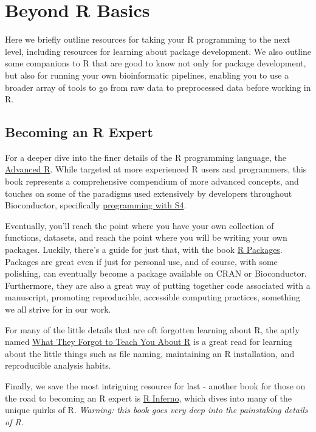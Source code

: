 \documentclass[]{book}
\begin{document}
\hypertarget{beyond-r-basics}{%
\chapter{Beyond R Basics}\label{beyond-r-basics}}

Here we briefly outline resources for taking your R programming to the next level, including resources for learning about package development. We also outline some companions to R that are good to know not only for package development, but also for running your own bioinformatic pipelines, enabling you to use a broader array of tools to go from raw data to preprocessed data before working in R.

\hypertarget{becoming-an-r-expert}{%
\section{Becoming an R Expert}\label{becoming-an-r-expert}}

For a deeper dive into the finer details of the R programming language, the \href{https://adv-r.hadley.nz/}{Advanced R}. While targeted at more experienced R users and programmers, this book represents a comprehensive compendium of more advanced concepts, and touches on some of the paradigms used extensively by developers throughout Bioconductor, specifically \href{https://adv-r.hadley.nz/s4.html}{programming with S4}.

Eventually, you'll reach the point where you have your own collection of functions, datasets, and reach the point where you will be writing your own packages. Luckily, there's a guide for just that, with the book \href{http://r-pkgs.had.co.nz/}{R Packages}. Packages are great even if just for personal use, and of course, with some polishing, can eventually become a package available on CRAN or Bioconductor. Furthermore, they are also a great way of putting together code associated with a manuscript, promoting reproducible, accessible computing practices, something we all strive for in our work.

For many of the little details that are oft forgotten learning about R, the aptly named \href{https://whattheyforgot.org/}{What They Forgot to Teach You About R} is a great read for learning about the little things such as file naming, maintaining an R installation, and reproducible analysis habits.

Finally, we save the most intriguing resource for last - another book for those on the road to becoming an R expert is \href{https://www.burns-stat.com/pages/Tutor/R_inferno.pdf}{R Inferno}, which dives into many of the unique quirks of R. \emph{Warning: this book goes \emph{very} deep into the painstaking details of R.}
\end{document}
